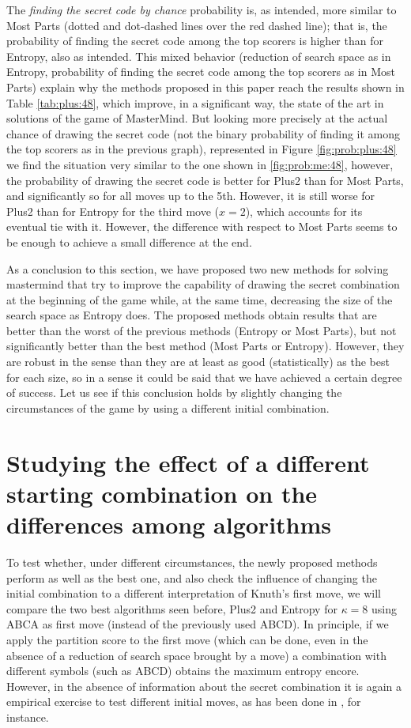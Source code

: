 \documentclass[preprint,12pt]{elsarticle}
\begin{document}
The {\em finding the secret code by chance} probability is, as
intended, more similar to Most Parts (dotted and dot-dashed lines over the
red dashed line); that is, the probability of finding the secret code
among the top scorers is higher than for Entropy, also as
intended. This mixed behavior (reduction of search space as in
Entropy, probability of finding the secret code among the top scorers
as in Most Parts) explain why the methods proposed in this paper reach
the results shown in Table \ref{tab:plus:48}, which improve, in a
significant way, the state of the art in solutions of the game of
MasterMind. But looking more precisely at the actual chance of drawing
the secret code (not the binary probability of finding it among the
top scorers as in the previous graph), represented in Figure
\ref{fig:prob:plus:48} we find the situation very similar to the one
shown in \ref{fig:prob:me:48}, however, the probability of drawing the
secret code is better for Plus2 than for Most Parts, and significantly
so for all moves up to the 5th. However, it is still worse for Plus2
than for Entropy for the third move ($x=2$), which accounts for its
eventual tie with it. However, the difference with respect to Most
Parts seems to be enough to achieve a small difference at the end. 

As a conclusion to this section, we have proposed two new methods for
solving mastermind that try to improve the capability of drawing the
secret combination at the beginning of the game while, at the same
time, decreasing the size of the search space as Entropy does. The
proposed methods obtain results that are better than the worst of the
previous methods (Entropy or Most Parts), but not significantly better
than the best method (Most Parts or Entropy). However, they are robust
in the sense than they are at least as good (statistically) as the
best for each size, so in a sense it could be said that we have
achieved a certain degree of success. Let us see if this conclusion
holds by slightly changing the circumstances of the game by using a
different initial combination. 

\section{Studying the effect of a different starting combination on the differences among algorithms}

To test whether, under different circumstances, the newly proposed
methods perform as well as the best one, and also check the influence
of changing the initial combination to a different interpretation of
Knuth's first move, we will compare the two best algorithms seen
before, Plus2 and Entropy for $\kappa=8$ using ABCA as first move (instead of the
previously used ABCD). In principle, if we apply the partition score
to the first move (which can be done, even in the absence of a
reduction of search space brought by a move) a combination with
different symbols (such as ABCD) obtains the maximum entropy
encore. However, in the absence of information about the secret
combination it is again a empirical exercise to test different initial
moves, as has been done in \cite{Berghman20091880}, for instance. 
\end{document}
